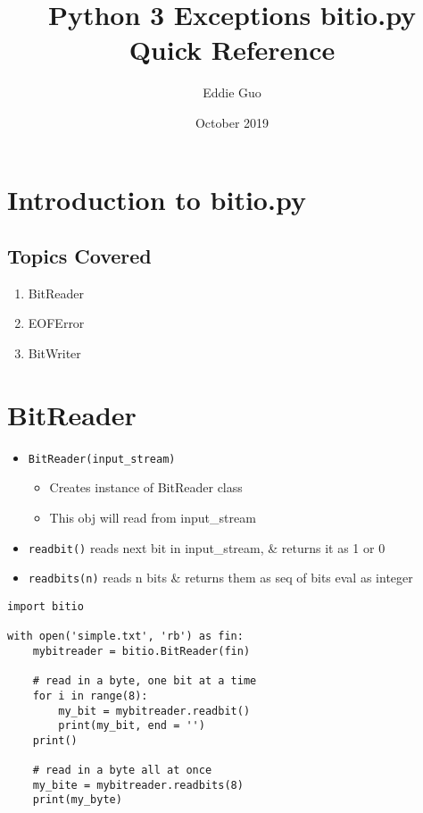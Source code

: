\documentclass{article}
\title{Python 3 Exceptions bitio.py Quick Reference}
\author{Eddie Guo}
\date{October 2019}
\begin{document}
\lstset{language=Python}
\maketitle

\section{Introduction to bitio.py}
\subsection{Topics Covered}
    \begin{multicols}{2}
        \begin{enumerate}[label=(\roman*)]
            \item BitReader
            \item EOFError
            \item BitWriter
        \end{enumerate}
    \end{multicols}

\section{BitReader}
    \begin{multicols}{2}
        \begin{itemize}
            \item \texttt{BitReader(input\_stream)}
                \begin{itemize}
                    \item Creates instance of BitReader class
                    \item This obj will read from input\_stream
                \end{itemize}
            \item \texttt{readbit()} reads next bit in input\_stream, \& returns it as 1 or 0
            \item \texttt{readbits(n)} reads n bits \& returns them as seq of bits eval as integer
        \end{itemize}
    \end{multicols}
\vspace{-2em}
\begin{lstlisting}
import bitio

with open('simple.txt', 'rb') as fin:
    mybitreader = bitio.BitReader(fin)
    
    # read in a byte, one bit at a time
    for i in range(8):
        my_bit = mybitreader.readbit()
        print(my_bit, end = '')
    print()
    
    # read in a byte all at once
    my_bite = mybitreader.readbits(8)
    print(my_byte)
\end{lstlisting}
\end{document}
